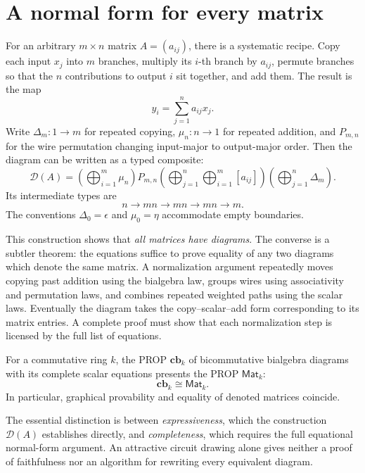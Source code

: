 \section{A normal form for every matrix}

For an arbitrary \(m\times n\) matrix \(A=(a_{ij})\), there is a systematic recipe. Copy each input \(x_j\) into \(m\) branches, multiply its \(i\)-th branch by \(a_{ij}\), permute branches so that the \(n\) contributions to output \(i\) sit together, and add them. The result is the map
\[
 y_i=\sum_{j=1}^{n}a_{ij}x_j.
\]
Write \(\Delta_m:1\to m\) for repeated copying, \(\mu_n:n\to1\) for repeated addition, and \(P_{m,n}\) for the wire permutation changing input-major to output-major order. Then the diagram can be written as a typed composite:
\[
 \mathcal D(A)=
 \left(\bigoplus_{i=1}^m\mu_n\right)
 P_{m,n}
 \left(\bigoplus_{j=1}^n\bigoplus_{i=1}^m[a_{ij}]\right)
 \left(\bigoplus_{j=1}^n\Delta_m\right).
\]
Its intermediate types are
\[
 n\longrightarrow mn\longrightarrow mn
 \longrightarrow mn\longrightarrow m.
\]
The conventions \(\Delta_0=\epsilon\) and \(\mu_0=\eta\) accommodate empty boundaries.

This construction shows that \emph{all matrices have diagrams}. The converse is a subtler theorem: the equations suffice to prove equality of any two diagrams which denote the same matrix. A normalization argument repeatedly moves copying past addition using the bialgebra law, groups wires using associativity and permutation laws, and combines repeated weighted paths using the scalar laws. Eventually the diagram takes the copy--scalar--add form corresponding to its matrix entries. A complete proof must show that each normalization step is licensed by the full list of equations.

\begin{theorem}
For a commutative ring \(k\), the PROP \(\mathbf{cb}_k\) of bicommutative bialgebra diagrams with its complete scalar equations presents the PROP \(\mathsf{Mat}_k\):
\[
 \boxed{\mathbf{cb}_k\cong\mathsf{Mat}_k.}
\]
In particular, graphical provability and equality of denoted matrices coincide.
\end{theorem}

The essential distinction is between \emph{expressiveness}, which the construction \(\mathcal D(A)\) establishes directly, and \emph{completeness}, which requires the full equational normal-form argument. An attractive circuit drawing alone gives neither a proof of faithfulness nor an algorithm for rewriting every equivalent diagram.

